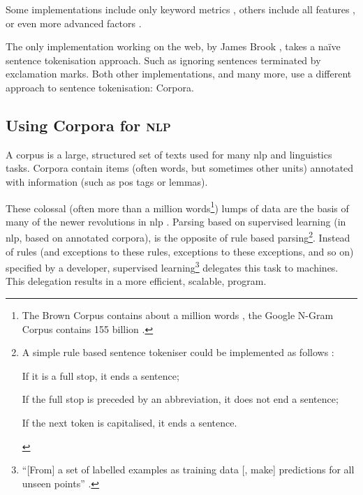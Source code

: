 \noindent Some implementations include only keyword metrics
  \autocite{jbrooksuk/node-summary-source-code}, others include all features
  \autocite{MojoJolo/textteaser-source-code}, or even more advanced factors
  \autocite{summly}.

The only implementation working on the web, by James Brook
  \autocite*{jbrooksuk/node-summary-source-code}, takes a na\"ive sentence
  tokenisation approach.
Such as ignoring sentences terminated by exclamation marks.
Both other implementations, and many more, use a different approach to
  sentence tokenisation: Corpora.

\subsection{Using Corpora for \textsc{nlp}}\label{using-corpora-for}

A corpus is a large, structured set of texts used for many \gls{nlp}
  and linguistics tasks.
Corpora contain items (often words, but sometimes other units) annotated
  with information (such as \gls{pos} tags or lemmas).

These colossal (often more than a million words\footnote{The Brown Corpus
    contains about a million words \autocite{francis-nelson-brown-corpus},
    the Google N-Gram Corpus contains 155 billion
    \autocite{brants-thorsten-google-ngram-corpus}.})
  lumps of data are the basis of many of the newer revolutions in \gls{nlp}
  \autocite{mitkov-ruslan-ea-importance-corpora}.
Parsing based on supervised learning (in \gls{nlp}, based on annotated
  corpora), is the opposite of rule based parsing\footnote{A simple
    rule based sentence tokeniser could be implemented as follows
    \autocite{attivio.com-doing-things-with-sentences}:

    \begin{aenumerate}
      \item If it is a full stop, it ends a sentence;
      \item If the full stop is preceded by an abbreviation, it does not end
        a sentence;
      \item If the next token is capitalised, it ends a sentence.
    \end{aenumerate}}.
Instead of rules (and exceptions to these rules, exceptions to these
  exceptions, and so on) specified by a developer,
  supervised learning\footnote{``{[}From{]} a set of labelled examples as
    training data {[}, make{]} predictions for all unseen points''
    \autocite{mohri-mehryar-foundations-machine-learning}.}
  delegates this task to machines.
This delegation results in a more efficient, scalable, program.

